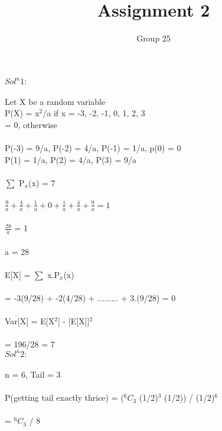 \documentclass{article}
\title{Assignment 2}
\author{Group 25}
\begin{document}
\maketitle

\textbf{$Sol^n 1:$} \\\\
Let X be a random variable\\
P(X) = x$^2$/a if x = -3, -2, -1, 0, 1, 2, 3 \\
     = 0, otherwise \\\\
P(-3) = 9/a, P(-2) = 4/a, P(-1) = 1/a, p(0) = 0 \\
P(1) = 1/a, P(2) = 4/a, P(3) = 9/a \\\\
$\sum$ P$_x$(x) = 7 \\\\
$\frac{9}{a} + \frac{4}{a} + \frac{1}{a} + 0 + \frac{1}{a} + \frac{4}{a} + \frac{9}{a} = 1$ \\\\
$\frac{28}{a}$ = 1\\\\
a = 28 \\\\
E[X] = $\sum$ x.P$_x$(x)\\\\
= -3(9/28) + -2(4/28) + ......... + 3.(9/28) = 0 \\\\
Var[X] = E[X$^2$] - [E[X]]$^2$\\\\
= 196/28 = 7\\

\textbf{$Sol^n 2:$} \\\\
n = 6, Tail = 3 \\\\
P(getting tail exactly thrice) = ($^6C_3$ (1/2)$^3$ (1/2)) / (1/2)$^6$ \\\\
= $^6C_3$ / 8 \\\\
\\
\end{document}
